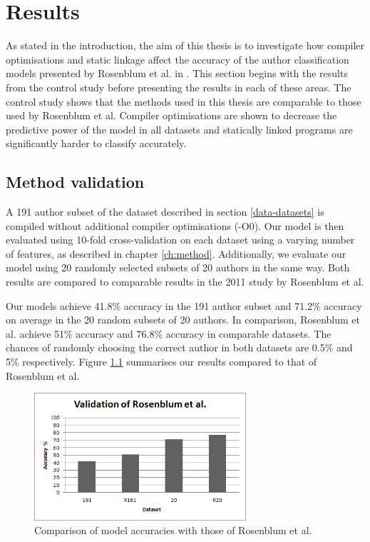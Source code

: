 \documentclass[a4paper,11pt]{kth-mag}
\begin{document}
\chapter{Results}
\label{ch:results}
As stated in the introduction, the aim of this thesis is to investigate how
compiler optimisations and static linkage affect the accuracy of the author
classification models presented by Rosenblum et al. in
\parencite{rosenblum2011wrote}. This section begins with the results from the
control study before presenting the results in each of these areas. The control
study shows that the methods used in this thesis are comparable to those used
by Rosenblum et al. Compiler optimisations are shown to decrease the predictive
power of the model in all datasets and statically linked programs are
significantly harder to classify accurately.

\section{Method validation}
\label{sec:method-validation}
A 191 author subset of the dataset described in section \ref{data-datasets} is
compiled without additional compiler optimisations (-O0). Our model is then
evaluated using 10-fold cross-validation on each dataset using a varying number
of features, as described in chapter \ref{ch:method}. Additionally, we evaluate
our model using 20 randomly selected subsets of 20 authors in the same way.
Both results are compared to comparable results in the 2011 study by Rosenblum
et al.

Our models achieve 41.8\% accuracy in the 191 author subset and 71.2\% accuracy
on average in the 20 random subsets of 20 authors. In comparison, Rosenblum et
al. achieve 51\% accuracy and 76.8\% accuracy in comparable datasets. The
chances of randomly choosing the correct author in both datasets are 0.5\% and
5\% respectively. Figure \ref{fig:rosenblumvalidation} summarises our results
compared to that of Rosenblum et al.

\begin{figure}[!htb]
    \centering
    \includegraphics[width=0.7\textwidth]{rosenblumvalidation}
    \caption{Comparison of model accuracies with those of Rosenblum et al.}
    \label{fig:rosenblumvalidation}
\end{figure}
\end{document}

